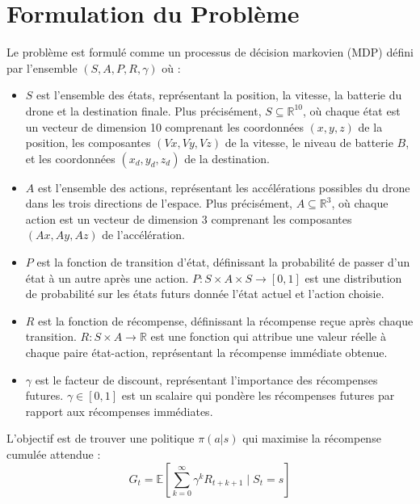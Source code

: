 \documentclass[a4paper, 12pt]{article}
\begin{document}
\section{Formulation du Problème}
Le problème est formulé comme un processus de décision markovien (MDP) défini par l'ensemble $(S, A, P, R, \gamma)$ où :
\begin{itemize}
    \item $S$ est l'ensemble des états, représentant la position, la vitesse, la batterie du drone et la destination finale. Plus précisément, $S \subseteq \mathbb{R}^{10}$, où chaque état est un vecteur de dimension 10 comprenant les coordonnées $(x, y, z)$ de la position, les composantes $(Vx, Vy, Vz)$ de la vitesse, le niveau de batterie $B$, et les coordonnées $(x_d, y_d, z_d)$ de la destination.
    \item $A$ est l'ensemble des actions, représentant les accélérations possibles du drone dans les trois directions de l'espace. Plus précisément, $A \subseteq \mathbb{R}^3$, où chaque action est un vecteur de dimension 3 comprenant les composantes $(Ax, Ay, Az)$ de l'accélération.
    \item $P$ est la fonction de transition d'état, définissant la probabilité de passer d'un état à un autre après une action. $P : S \times A \times S \rightarrow [0, 1]$ est une distribution de probabilité sur les états futurs donnée l'état actuel et l'action choisie.
    \item $R$ est la fonction de récompense, définissant la récompense reçue après chaque transition. $R : S \times A \rightarrow \mathbb{R}$ est une fonction qui attribue une valeur réelle à chaque paire état-action, représentant la récompense immédiate obtenue.
    \item $\gamma$ est le facteur de discount, représentant l'importance des récompenses futures. $\gamma \in [0, 1]$ est un scalaire qui pondère les récompenses futures par rapport aux récompenses immédiates.
\end{itemize}

L'objectif est de trouver une politique $\pi(a|s)$ qui maximise la récompense cumulée attendue :
\[
G_t = \mathbb{E} \left[ \sum_{k=0}^{\infty} \gamma^k R_{t+k+1} \mid S_t = s \right]
\]
\end{document}

